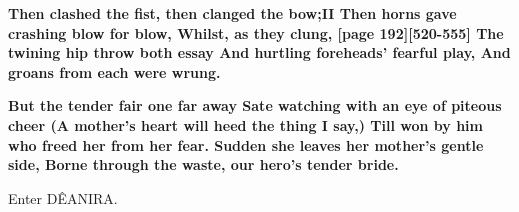 \documentclass[11pt,letter]{book}
\begin{document}
\par \textbf{Then clashed the fist, then clanged the bow;II Then horns gave crashing blow for blow, Whilst, as they clung, [page 192][520-555] The twining hip throw both essay And hurtling foreheads’ fearful play, And groans from each were wrung.}
\par 

\par \textbf{But the tender fair one far away Sate watching with an eye of piteous cheer (A mother’s heart will heed the thing I say,) Till won by him who freed her from her fear. Sudden she leaves her mother’s gentle side, Borne through the waste, our hero’s tender bride.}
\par 

\par  Enter DÊANIRA.
\end{document}
